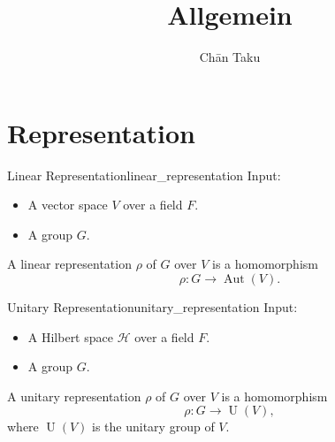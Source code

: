 \documentclass{article}
\title{Allgemein}
\author{Ch\=an Taku}
\begin{document}
\maketitle

\section{Representation}

\begin{definition}{Linear Representation}{linear_representation}
    Input:
    \begin{itemize}
        \item A vector space $V$ over a field $F$.
        \item A group $G$.
    \end{itemize}
    A linear representation $\rho$ of $G$ over $V$ is a homomorphism
    \[ \rho: G \rightarrow \operatorname{Aut}(V). \]
\end{definition}
\begin{definition}{Unitary Representation}{unitary_representation}
    Input:
    \begin{itemize}
        \item A Hilbert space $\mathcal{H}$ over a field $F$.
        \item A group $G$.
    \end{itemize}
    A unitary representation $\rho$ of $G$ over $V$ is a homomorphism
    \[ \rho: G \rightarrow \operatorname{U}(V), \]
    where $\operatorname{U}(V)$ is the unitary group of $V$.
\end{definition}
\end{document}
